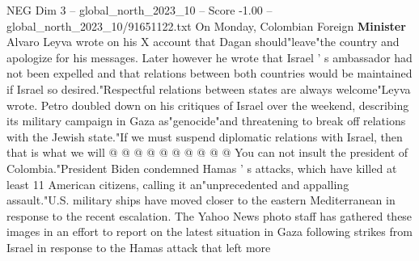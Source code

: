 \begin{textsample}{NEG Dim 3 – global\_north\_2023\_10 – Score -1.00 – global\_north\_2023\_10/91651122.txt}
On Monday, Colombian Foreign \textbf{Minister} Alvaro Leyva wrote on his X account that Dagan should"leave"the country and apologize for his messages.
Later however he wrote that Israel ' s ambassador had not been expelled and that relations between both countries would be maintained if Israel so desired."Respectful relations between states are always welcome"Leyva wrote.
Petro doubled down on his critiques of Israel over the weekend, describing its military campaign in Gaza as"genocide"and threatening to break off relations with the Jewish state."If we must suspend diplomatic relations with Israel, then that is what we will @ @ @ @ @ @ @ @ @ @ You can not insult the president of Colombia."President Biden condemned Hamas ' s attacks, which have killed at least 11 American citizens, calling it an"unprecedented and appalling assault."U.S. military ships have moved closer to the eastern Mediterranean in response to the recent escalation.
The Yahoo News photo staff has gathered these images in an effort to report on the latest situation in Gaza following strikes from Israel in response to the Hamas attack that left more

\end{textsample}
